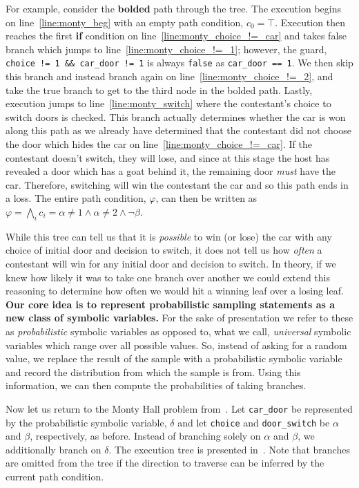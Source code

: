 \documentclass[acmsmall,review,anonymous]{acmart}\settopmatter{printfolios=true,printccs=false,printacmref=false}
\begin{document}
For example, consider the \textbf{bolded} path through the tree.
% 
The execution begins on line~\ref{line:monty_beg} with an empty path condition, $c_0 = \top$.
% 
Execution then reaches the first \textbf{if} condition on line~\ref{line:monty_choice_!=_car} and takes false branch which jumps to line~\ref{line:monty_choice_!=_1}; however, the guard, \texttt{choice != 1 \&\& car\_door != 1} is always \texttt{false} as \texttt{car\_door == 1}.
% 
We then skip this branch and instead branch again on line~\ref{line:monty_choice_!=_2}, and take the true branch to get to the third node in the bolded path.
% 
Lastly, execution jumps to line~\ref{line:monty_switch} where the contestant's choice to switch doors is checked.
% 
This branch actually determines whether the car is won along this path as we already have determined that the contestant did not choose the door which hides the car on line~\ref{line:monty_choice_!=_car}.
% 
If the contestant doesn't switch, they will lose, and since at this stage the host has revealed a door which has a goat behind it, the remaining door \textit{must} have the car.
% 
Therefore, switching will win the contestant the car and so this path ends in a loss.
% 
The entire path condition, $\varphi$, can then be written as $\varphi = \bigwedge_i c_i = \alpha \neq 1 \wedge \alpha \neq 2 \wedge \neg\beta$.


While this tree can tell us that it is \textit{possible} to win (or lose) the car with any choice of initial door and decision to switch, it does not tell us how \textit{often} a contestant will win for any initial door and decision to switch.
% 
In theory, if we knew how likely it was to take one branch over another we could extend this reasoning to determine how often we would hit a winning leaf over a losing leaf.
% 
\textbf{Our core idea is to represent probabilistic sampling statements as a new class of symbolic variables.}
% 
For the sake of presentation we refer to these as \textit{probabilistic} symbolic variables as opposed to, what we call, \textit{universal} symbolic variables which range over all possible values.
% 
So, instead of asking for a random value, we replace the result of the sample with a probabilistic symbolic variable and record the distribution from which the sample is from.
% 
Using this information, we can then compute the probabilities of taking branches.


Now let us return to the Monty Hall problem from~.
% 
Let \texttt{car\_door} be represented by the probabilistic symbolic variable, $\delta$ and let \texttt{choice} and \texttt{door\_switch} be $\alpha$ and $\beta$, respectively, as before.
% 
Instead of branching solely on $\alpha$ and $\beta$, we additionally branch on $\delta$.
% 
The execution tree is presented in~.
% 
Note that branches are omitted from the tree if the direction to traverse can be inferred by the current path condition.
\end{document}
